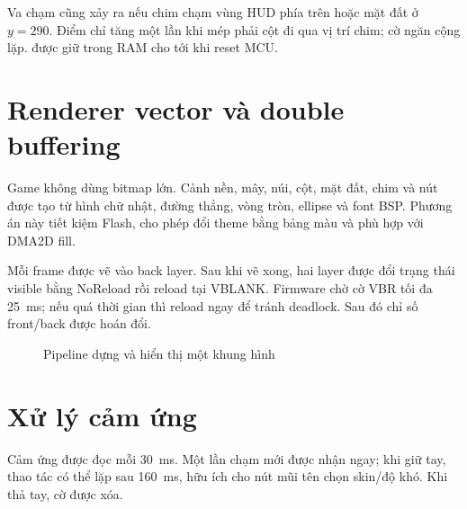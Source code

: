 Va chạm cũng xảy ra nếu chim chạm vùng HUD phía trên hoặc mặt đất ở $y=290$. Điểm chỉ tăng một lần khi mép phải cột đi qua vị trí chim; cờ  ngăn cộng lặp.  được giữ trong RAM cho tới khi reset MCU.

\section{Renderer vector và double buffering}

Game không dùng bitmap lớn. Cảnh nền, mây, núi, cột, mặt đất, chim và nút được tạo từ hình chữ nhật, đường thẳng, vòng tròn, ellipse và font BSP. Phương án này tiết kiệm Flash, cho phép đổi theme bằng bảng màu và phù hợp với DMA2D fill.

Mỗi frame được vẽ vào back layer. Sau khi vẽ xong, hai layer được đổi trạng thái visible bằng NoReload rồi reload tại VBLANK. Firmware chờ cờ VBR tối đa \SI{25}{\milli\second}; nếu quá thời gian thì reload ngay để tránh deadlock. Sau đó chỉ số front/back được hoán đổi.

\begin{figure}[H]
  \centering
  \caption{Pipeline dựng và hiển thị một khung hình}
  \label{fig:render-pipeline}
\end{figure}

\section{Xử lý cảm ứng}

Cảm ứng được đọc mỗi \SI{30}{\milli\second}. Một lần chạm mới được nhận ngay; khi giữ tay, thao tác có thể lặp sau \SI{160}{\milli\second}, hữu ích cho nút mũi tên chọn skin/độ khó. Khi thả tay, cờ  được xóa.

